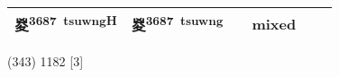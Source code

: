 \documentclass[14pt,a4paper]{scrartcl}
\begin{document}
\begin{longtable}[c]{@{}llllll@{}}
\begin{minipage}[t]{0.14\columnwidth}\raggedright\strut
㚇\textsuperscript{3687~tsuwngH}
\strut\end{minipage} &
\begin{minipage}[t]{0.14\columnwidth}\raggedright\strut
㚇\textsuperscript{3687~tsuwng}
\strut\end{minipage} &
\begin{minipage}[t]{0.14\columnwidth}\raggedright\strut
\strut\end{minipage} &
\begin{minipage}[t]{0.14\columnwidth}\raggedright\strut
mixed
\strut\end{minipage}\tabularnewline
\bottomrule
\end{longtable}

(343) 1182 {[}3{]}
\end{document}
